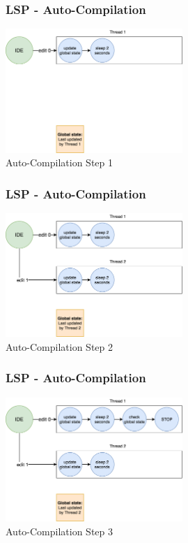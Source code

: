\documentclass[aspectratio=169]{beamer}
\begin{document}
\begin{frame}
\begin{figure}
\frametitle{LSP - Auto-Compilation}
    \centering
    \includegraphics[width=0.6\textwidth]{figures/lsp-step-1.png}
    \caption*{Auto-Compilation Step 1}
\end{figure}
\end{frame}

\begin{frame}
\begin{figure}
\frametitle{LSP - Auto-Compilation}
    \centering
    \includegraphics[width=0.6\textwidth]{figures/lsp-step-2.png}
    \caption*{Auto-Compilation Step 2}
\end{figure}
\end{frame}

\begin{frame}
\begin{figure}
\frametitle{LSP - Auto-Compilation}
    \centering
    \includegraphics[width=0.6\textwidth]{figures/lsp-step-3.png}
    \caption*{Auto-Compilation Step 3}
\end{figure}
\end{frame}
\end{document}

